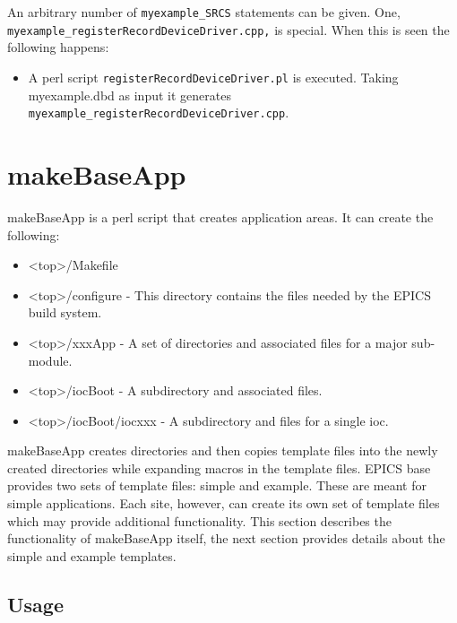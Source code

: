 An arbitrary number of \verb|myexample_SRCS| statements can be given. One, \\
\verb|myexample_registerRecordDeviceDriver.cpp,| is special. When this is seen the following happens:

\begin{itemize}\item A perl script \verb|registerRecordDeviceDriver.pl| is executed. Taking myexample.dbd as input it generates 
\verb|myexample_registerRecordDeviceDriver.cpp|.

\end{itemize}\section{makeBaseApp}

makeBaseApp is a perl script that creates application areas. It can create the following:

\begin{itemize}\item \textless{}top\textgreater{}/Makefile

\item \textless{}top\textgreater{}/configure - This directory contains the files needed by the EPICS build system.

\item  \textless{}top\textgreater{}/xxxApp - A set of directories and associated files for a  major sub-module.

\item \textless{}top\textgreater{}/iocBoot - A subdirectory and associated files.

\item  \textless{}top\textgreater{}/iocBoot/iocxxx - A subdirectory and files for a single ioc.

\end{itemize}makeBaseApp creates directories and then copies template files into the newly created directories while expanding 
macros in the template files. EPICS base provides two sets of template files: simple and example. These are meant for 
simple applications. Each site, however, can create its own set of template files which may provide additional 
functionality. This section describes the functionality of makeBaseApp itself, the next section provides details about the 
simple and example templates.

\subsection{Usage}

